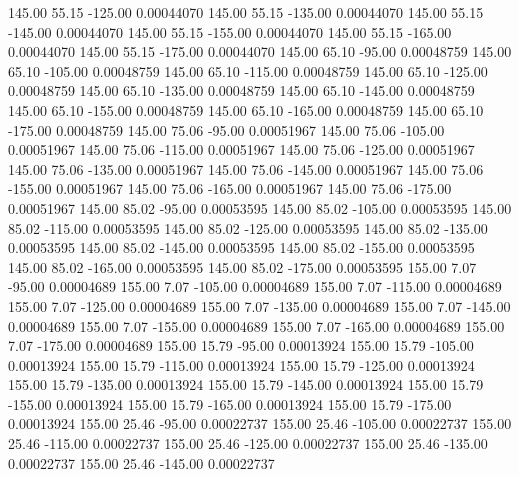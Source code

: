     145.00     55.15   -125.00     0.00044070
    145.00     55.15   -135.00     0.00044070
    145.00     55.15   -145.00     0.00044070
    145.00     55.15   -155.00     0.00044070
    145.00     55.15   -165.00     0.00044070
    145.00     55.15   -175.00     0.00044070
    145.00     65.10    -95.00     0.00048759
    145.00     65.10   -105.00     0.00048759
    145.00     65.10   -115.00     0.00048759
    145.00     65.10   -125.00     0.00048759
    145.00     65.10   -135.00     0.00048759
    145.00     65.10   -145.00     0.00048759
    145.00     65.10   -155.00     0.00048759
    145.00     65.10   -165.00     0.00048759
    145.00     65.10   -175.00     0.00048759
    145.00     75.06    -95.00     0.00051967
    145.00     75.06   -105.00     0.00051967
    145.00     75.06   -115.00     0.00051967
    145.00     75.06   -125.00     0.00051967
    145.00     75.06   -135.00     0.00051967
    145.00     75.06   -145.00     0.00051967
    145.00     75.06   -155.00     0.00051967
    145.00     75.06   -165.00     0.00051967
    145.00     75.06   -175.00     0.00051967
    145.00     85.02    -95.00     0.00053595
    145.00     85.02   -105.00     0.00053595
    145.00     85.02   -115.00     0.00053595
    145.00     85.02   -125.00     0.00053595
    145.00     85.02   -135.00     0.00053595
    145.00     85.02   -145.00     0.00053595
    145.00     85.02   -155.00     0.00053595
    145.00     85.02   -165.00     0.00053595
    145.00     85.02   -175.00     0.00053595
    155.00      7.07    -95.00     0.00004689
    155.00      7.07   -105.00     0.00004689
    155.00      7.07   -115.00     0.00004689
    155.00      7.07   -125.00     0.00004689
    155.00      7.07   -135.00     0.00004689
    155.00      7.07   -145.00     0.00004689
    155.00      7.07   -155.00     0.00004689
    155.00      7.07   -165.00     0.00004689
    155.00      7.07   -175.00     0.00004689
    155.00     15.79    -95.00     0.00013924
    155.00     15.79   -105.00     0.00013924
    155.00     15.79   -115.00     0.00013924
    155.00     15.79   -125.00     0.00013924
    155.00     15.79   -135.00     0.00013924
    155.00     15.79   -145.00     0.00013924
    155.00     15.79   -155.00     0.00013924
    155.00     15.79   -165.00     0.00013924
    155.00     15.79   -175.00     0.00013924
    155.00     25.46    -95.00     0.00022737
    155.00     25.46   -105.00     0.00022737
    155.00     25.46   -115.00     0.00022737
    155.00     25.46   -125.00     0.00022737
    155.00     25.46   -135.00     0.00022737
    155.00     25.46   -145.00     0.00022737
